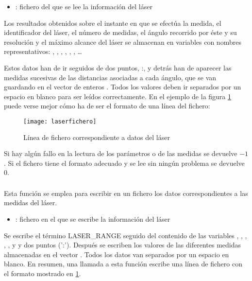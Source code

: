 \begin{itemize}
  \item {}: fichero del que se lee la información del láser
\end{itemize}

\noindent
Los resultados obtenidos sobre el instante en que se efectúa la medida, el identificador del láser, el número de medidas, el ángulo recorrido por éste y su resolución y el máximo alcance del láser se almacenan en variables con nombres representativos: , , , , , , \ldots

Estos datos han de ir seguidos de dos puntos, :, y detrás han de aparecer las medidas sucesivas de las distancias asociadas a cada ángulo, que se van guardando en el vector de enteros . Todos los valores deben ir separados por un espacio en blanco para ser leídos correctamente. En el ejemplo de la figura \ref{fg:ficherolaser} puede verse mejor cómo ha de ser el formato de una línea del fichero:

\begin{figure}[h]
  \centering\texttt{[image: laserfichero]}\\
  \caption{Línea de fichero correspondiente a datos del láser}\label{fg:ficherolaser}
\end{figure}

\noindent
Si hay algún fallo en la lectura de los parámetros o de las medidas se devuelve $-1$. Si el fichero tiene el formato adecuado y se lee sin ningún problema se devuelve $0$.

\subsubsection{}


\noindent
Esta función se emplea para escribir en un fichero los datos correspondientes a las medidas del láser.

\begin{itemize}
  \item {}: fichero en el que se escribe la información del láser
\end{itemize}

\noindent
Se escribe el término LASER\_RANGE seguido del contenido de las variables , , , , ,  y  y dos puntos (':'). Después se escriben los valores de las diferentes medidas almacenadas en el vector . Todos los datos van separados por un espacio en blanco. En resumen, una llamada a esta función escribe una línea de fichero con el formato mostrado en \ref{fg:ficherolaser}.


